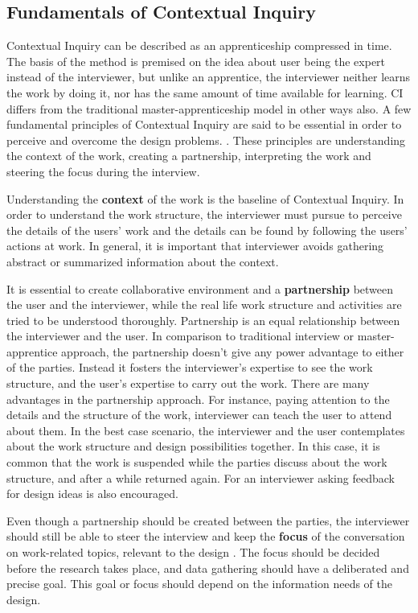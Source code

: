 \documentclass[12pt,a4paper,oneside,pdftex]{report}
\begin{document}
\subsection{Fundamentals of Contextual Inquiry}
Contextual Inquiry can be described as an apprenticeship compressed in time. The basis of the method is premised on the idea about user being the expert instead of the interviewer, but unlike an apprentice, the interviewer neither learns the work by doing it, nor has the same amount of time available for learning. \cite{RefWorks:21} CI differs from the traditional master-apprenticeship model in other ways also. A few fundamental principles of Contextual Inquiry are said to be essential in order to perceive and overcome the design problems. \cite{RefWorks:21, RefWorks:22}. These principles are understanding the context of the work, creating a partnership, interpreting the work and steering the focus during the interview. \cite{RefWorks:21, RefWorks:28}

Understanding the \textbf{context} of the work is the baseline of Contextual Inquiry. In order to understand the work structure, the interviewer must pursue to perceive the details of the users' work and the details can be found by following the users' actions at work. In general, it is important that interviewer avoids gathering abstract or summarized information about the context.\cite{RefWorks:21}

It is essential to create collaborative environment and a \textbf{partnership} between the user and the interviewer, while the real life work structure and activities are tried to be understood thoroughly. Partnership is an equal relationship between the interviewer and the user. In comparison to traditional interview or master-apprentice approach, the partnership doesn't give any power advantage to either of the parties. Instead it fosters the interviewer's expertise to see the work structure, and the user's expertise to carry out the work. There are many advantages in the partnership approach. For instance, paying attention to the details and the structure of the work, interviewer can teach the user to attend about them. In the best case scenario, the interviewer and the user contemplates about the work structure and design possibilities together. In this case, it is common that the work is suspended while the parties discuss about the work structure, and after a while returned again. For an interviewer asking feedback for design ideas is also encouraged.\cite{RefWorks:21}

Even though a partnership should be created between the parties, the interviewer should still be able to steer the interview and keep the \textbf{focus} of the conversation on work-related topics, relevant to the design \cite{RefWorks:21}. The focus should be decided before the research takes place, and data gathering should have a deliberated and precise goal. This goal or focus should depend on the information needs of the design.\cite{RefWorks:22}
\end{document}
